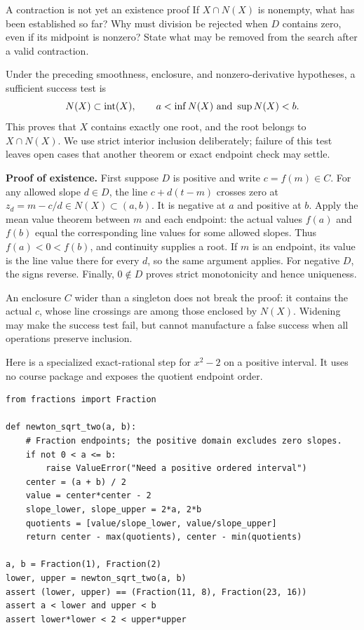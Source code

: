 \begin{question}{A contraction is not yet an existence proof}
If $X\cap N(X)$ is nonempty, what has been established so far? Why must
division be rejected when $D$ contains zero, even if its midpoint is nonzero?
State what may be removed from the search after a valid contraction.
\end{question}

\newpage
{}
Under the preceding smoothness, enclosure, and nonzero-derivative hypotheses,
a sufficient success test is
\[
                         N(X)\subset\operatorname{int}(X),
 \qquad a<\inf N(X)\ \hbox{and}\ \sup N(X)<b.
\]
This proves that $X$ contains exactly one root, and the root belongs to
$X\cap N(X)$. We use strict interior inclusion deliberately; failure of this
test leaves open cases that another theorem or exact endpoint check may settle.

\textbf{Proof of existence.} First suppose $D$ is positive and write
$c=f(m)\in C$. For any allowed slope $d\in D$, the line
$c+d(t-m)$ crosses zero at $z_d=m-c/d\in N(X)\subset(a,b)$.
It is negative at $a$ and positive at $b$. Apply the mean value theorem
between $m$ and each endpoint: the actual values $f(a)$ and $f(b)$ equal
the corresponding line values for some allowed slopes. Thus
$f(a)<0<f(b)$, and continuity supplies a root. If $m$ is an endpoint,
its value is the line value there for every $d$, so the same argument applies.
For negative $D$, the signs reverse. Finally, $0\notin D$ proves strict
monotonicity and hence uniqueness.

An enclosure $C$ wider than a singleton does not break the proof: it
contains the actual $c$, whose line crossings are among those enclosed by
$N(X)$. Widening may make the success test fail, but cannot manufacture
a false success when all operations preserve inclusion.

Here is a specialized exact-rational step for $x^2-2$ on a positive interval.
It uses no course package and exposes the quotient endpoint order.
\begin{lstlisting}
from fractions import Fraction

def newton_sqrt_two(a, b):
    # Fraction endpoints; the positive domain excludes zero slopes.
    if not 0 < a <= b:
        raise ValueError("Need a positive ordered interval")
    center = (a + b) / 2
    value = center*center - 2
    slope_lower, slope_upper = 2*a, 2*b
    quotients = [value/slope_lower, value/slope_upper]
    return center - max(quotients), center - min(quotients)

a, b = Fraction(1), Fraction(2)
lower, upper = newton_sqrt_two(a, b)
assert (lower, upper) == (Fraction(11, 8), Fraction(23, 16))
assert a < lower and upper < b
assert lower*lower < 2 < upper*upper
\end{lstlisting}


